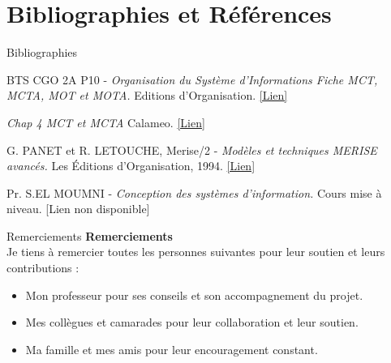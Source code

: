 \documentclass{beamer}
\begin{document}
\section{Bibliographies et Références}
\begin{frame}{Bibliographies}
\begin{thebibliography}{9}

BTS CGO 2A P10 -\textit{ Organisation du Système d’Informations Fiche MCT, MCTA, MOT et MOTA.} Editions d'Organisation. 
\href{https://bit.ly/3D5q0Gw}{[Lien]} 

\textit{ Chap 4 MCT et MCTA
} Calameo. 
\href{https://www.calameo.com/books/001856507ecb0380898f9}{[Lien]} 

G. PANET et R. LETOUCHE, Merise/2 -\textit{ Modèles et techniques MERISE avancés.} Les Éditions d'Organisation, 1994. 
\href{https://www.labri.fr/perso/guibert/DocumentsEnseignement/merise2.pdf}{[Lien]} 

Pr. S.EL MOUMNI -\textit{ Conception des systèmes d’information.} Cours mise à niveau. 
\alert{[Lien non disponible]}

\end{thebibliography}
\end{frame}

\begin{frame}{Remerciements}
    \centering
    \Huge{\textbf{Remerciements}} \\[1cm]
    
    \Large{Je tiens à remercier toutes les personnes suivantes pour leur soutien et leurs contributions :}
    \vspace{0.5cm}
    \begin{itemize}
        \item Mon professeur pour ses conseils et son accompagnement du projet.
        \item Mes collègues et camarades pour leur collaboration et leur soutien.
        \item Ma famille et mes amis pour leur encouragement constant.
    \end{itemize}
    \vspace{1cm}
    
\end{frame}
\end{document}
